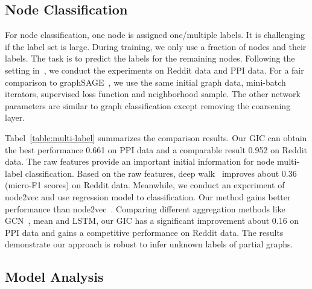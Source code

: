 \documentclass[letterpaper]{article} \usepackage{aaai19}  \usepackage{times}  \usepackage{helvet}  \usepackage{courier}  \usepackage{url}  \usepackage{graphicx}  \frenchspacing  \setlength{\pdfpagewidth}{8.5in}  \setlength{\pdfpageheight}{11in}
\begin{document}
\subsection{Node Classification}

For node classification, one node is assigned one/multiple labels. It is challenging if the label set is large. During training, we only use a fraction of nodes and their labels. The task is to predict the labels for the remaining nodes. Following the setting in~\cite{hamilton2017inductive}, we conduct the experiments on Reddit data and PPI data. For a fair comparison to graphSAGE~\cite{hamilton2017inductive}, we use the same initial graph data, mini-batch iterators, supervised loss function and neighborhood sample. The other network parameters are similar to graph classification except removing the coarsening layer.

Tabel~\ref{table:multi-label} summarizes the comparison results. Our GIC can obtain the best performance 0.661 on PPI data and a comparable result 0.952 on Reddit data. The raw features provide an important initial information for node multi-label classification. Based on the raw features, deep walk~\cite{perozzi2014deepwalk} improves about 0.36 (micro-F1 scores) on Reddit data. Meanwhile, we conduct an experiment of node2vec and use regression model to classification. Our method gains better performance than node2vec~\cite{grover2016node2vec}. Comparing different aggregation methods like GCN~\cite{kipf2016semi}, mean and LSTM, our GIC has a significant improvement about 0.16 on PPI data and gains a competitive performance on Reddit data. The results demonstrate our approach is robust to infer unknown labels of partial graphs.


\subsection{Model Analysis}
\end{document}
